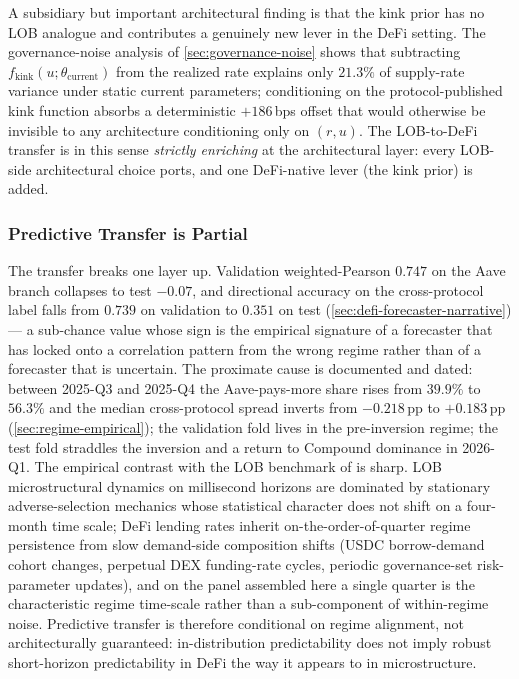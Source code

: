 A subsidiary but important architectural finding is that the kink
prior has no LOB analogue and contributes a genuinely new lever in
the DeFi setting. The governance-noise analysis of
\cref{sec:governance-noise} shows that subtracting
$f_{\text{kink}}(u;\theta_{\text{current}})$ from the realized rate
explains only $21.3\%$ of supply-rate variance under static current
parameters; conditioning on the protocol-published kink function
absorbs a deterministic $+186$\,bps offset that would otherwise be
invisible to any architecture conditioning only on $(r, u)$. The
LOB-to-DeFi transfer is in this sense \emph{strictly enriching} at
the architectural layer: every LOB-side architectural choice ports,
and one DeFi-native lever (the kink prior) is added.

\subsubsection{Predictive Transfer is Partial}
\label{sec:disc-pred}

The transfer breaks one layer up. Validation weighted-Pearson
$0.747$ on the Aave branch collapses to test
$-0.07$, and directional accuracy on the cross-protocol label
falls from $0.739$ on validation to $0.351$ on test
(\cref{sec:defi-forecaster-narrative}) --- a sub-chance value
whose sign is the empirical signature of a forecaster that has
locked onto a correlation pattern from the wrong regime rather
than of a forecaster that is uncertain. The proximate cause is
documented and dated: between 2025-Q3 and 2025-Q4 the
Aave-pays-more share rises from $39.9\%$ to $56.3\%$ and the
median cross-protocol spread inverts from $-0.218$\,pp to
$+0.183$\,pp (\cref{sec:regime-empirical}); the validation fold
lives in the pre-inversion regime; the test fold straddles the
inversion and a return to Compound dominance in 2026-Q1. The
empirical contrast with the LOB benchmark of
\cite{solovev2026lob} is sharp. LOB microstructural dynamics on
millisecond horizons are dominated by stationary adverse-selection
mechanics whose statistical character does not shift on a
four-month time scale; DeFi lending rates inherit
on-the-order-of-quarter regime persistence from slow demand-side
composition shifts (USDC borrow-demand cohort changes, perpetual
DEX funding-rate cycles, periodic governance-set risk-parameter
updates), and on the panel assembled here a single quarter is the
characteristic regime time-scale rather than a sub-component of
within-regime noise. Predictive transfer is therefore conditional
on regime alignment, not architecturally guaranteed: in-distribution
predictability does not imply robust short-horizon predictability
in DeFi the way it appears to in microstructure.

